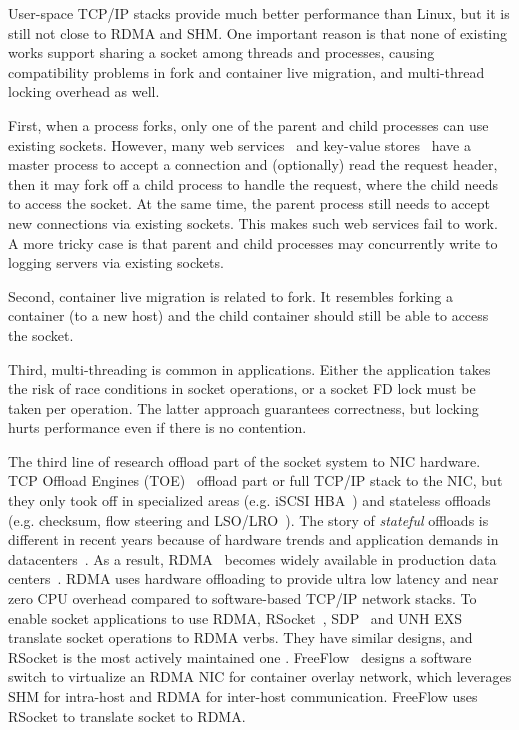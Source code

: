 User-space TCP/IP stacks provide much better performance than Linux, but it is still not close to RDMA and SHM.
One important reason is that none of existing works support sharing a socket among threads and processes, causing compatibility problems in fork and container live migration, and multi-thread locking overhead as well.

First, when a process forks, only one of the parent and child processes can use existing sockets.
However, many web services~\cite{apache,nginx,php-fpm,python-gunicorn,vsftpd} and key-value stores~\cite{memcached} have a master process to accept a connection and (optionally) read the request header, then it may fork off a child process to handle the request, where the child needs to access the socket.
At the same time, the parent process still needs to accept new connections via existing sockets.
This makes such web services fail to work.
A more tricky case is that parent and child processes may concurrently write to logging servers via existing sockets.

Second, container live migration is related to fork.
It resembles forking a container (to a new host) and the child container should still be able to access the socket.

Third, multi-threading is common in applications.
Either the application takes the risk of race conditions in socket operations, or a socket FD lock must be taken per operation.
The latter approach guarantees correctness, but locking hurts performance even if there is no contention.


The third line of research offload part of the socket system to NIC hardware.
TCP Offload Engines (TOE)~\cite{tcp-chimney-offload} offload part or full TCP/IP stack to the NIC, but they only took off in specialized areas (e.g. iSCSI HBA~\cite{iscsi-hba}) and stateless offloads (e.g. checksum, flow steering and LSO/LRO~\cite{lsolro}).
The story of \emph{stateful} offloads is different in recent years because of hardware trends and application demands in datacenters~\cite{chuanxiong-rdma-keynote}.
As a result, RDMA~\cite{infiniband2000infiniband} becomes widely available in production data centers~\cite{guo2016rdma}.
RDMA uses hardware offloading to provide ultra low latency and near zero CPU overhead compared to software-based TCP/IP network stacks.
To enable socket applications to use RDMA, RSocket~\cite{rsockets}, SDP~\cite{socketsdirect} and UNH EXS~\cite{russell2008extended} translate socket operations to RDMA verbs.
They have similar designs, and RSocket is the most actively maintained one .
FreeFlow~\cite{nsdi19freeflow} designs a software switch to virtualize an RDMA NIC for container overlay network, which leverages SHM for intra-host and RDMA for inter-host communication.
FreeFlow uses RSocket to translate socket to RDMA.

